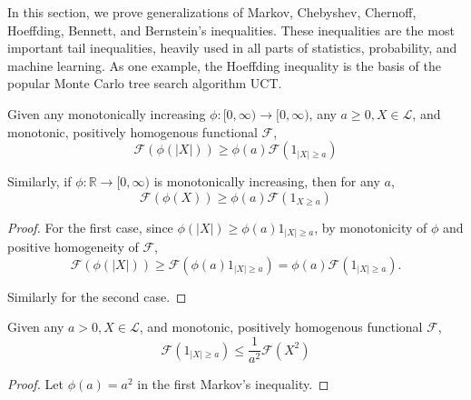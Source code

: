 In this section, we prove generalizations of Markov, Chebyshev, Chernoff, Hoeffding, Bennett, and Bernstein's inequalities. These inequalities are the most important tail inequalities, heavily used in all parts of statistics, probability, and machine learning. As one example, the Hoeffding inequality is the basis of the popular Monte Carlo tree search algorithm UCT\cite{kocsisBanditBasedMonteCarlo2006}.

\begin{prop}\label{prop:markov}
Given any monotonically increasing $\phi : [0, \infty) \to [0, \infty)$, any $a \ge 0, X\in\mathscr{L}$, and monotonic, positively homogenous functional $\mathcal{F}$,
\begin{equation}
\label{eq:markov}
\mathcal{F}(\phi(|X|)) \ge \phi(a) \mathcal{F}(1_{|X|\ge a})
\end{equation}

Similarly, if $\phi: \mathbb{R} \to [0, \infty)$ is monotonically increasing, then for any $a$, 
\begin{equation}
\label{eq:markov_2}
\mathcal{F}(\phi(X)) \ge \phi(a) \mathcal{F}(1_{X\ge a})
\end{equation} 
\end{prop}
\begin{proof}
For the first case, since $\phi(|X|) \ge \phi(a) 1_{|X|\ge a}$, by monotonicity of $\phi$ and positive homogeneity of $\mathcal{F}$, 
$$\mathcal{F}(\phi(|X|)) \ge  \mathcal{F}(\phi(a)1_{|X|\ge a}) = \phi(a)\mathcal{F}(1_{|X|\ge a}). $$

Similarly for the second case.
\end{proof}

\begin{prop}
Given any $a > 0, X\in\mathscr{L}$, and monotonic, positively homogenous functional $\mathcal{F}$,
\begin{equation}
\label{eq:chebyshev}
\mathcal{F}(1_{|X|\ge a})\le \frac{1}{a^2}\mathcal{F}(X^2) 
\end{equation}
\end{prop}
\begin{proof}
Let $\phi(a) = a^2$ in the first Markov's inequality.
\end{proof}

